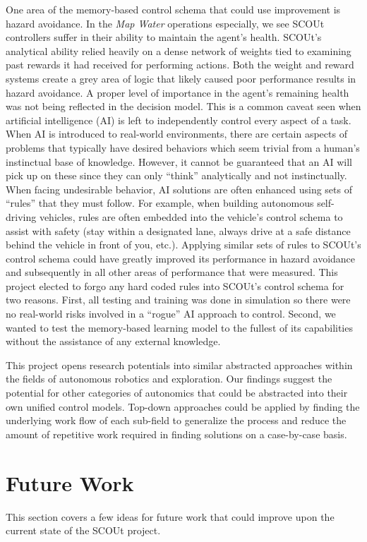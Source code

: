One area of the memory-based control schema that could use improvement is hazard avoidance.
In the \textit{Map Water} operations especially, we see SCOUt controllers suffer in their ability to maintain the agent's health.
SCOUt's analytical ability relied heavily on a dense network of weights tied to examining past rewards it had received for performing actions.
Both the weight and reward systems create a grey area of logic that likely caused poor performance results in hazard avoidance.
A proper level of importance in the agent's remaining health was not being reflected in the decision model.
This is a common caveat seen when artificial intelligence (AI) is left to independently control every aspect of a task.
When AI is introduced to real-world environments, there are certain aspects of problems that typically have desired behaviors which seem trivial from a human's instinctual base of knowledge.
However, it cannot be guaranteed that an AI will pick up on these since they can only ``think'' analytically and not instinctually.
When facing undesirable behavior, AI solutions are often enhanced using sets of ``rules'' that they must follow.
For example, when building autonomous self-driving vehicles, rules are often embedded into the vehicle's control schema to assist with safety (stay within a designated lane, always drive at a safe distance behind the vehicle in front of you, etc.).
Applying similar sets of rules to SCOUt's control schema could have greatly improved its performance in hazard avoidance and subsequently in all other areas of performance that were measured.
This project elected to forgo any hard coded rules into SCOUt's control schema for two reasons.
First, all testing and training was done in simulation so there were no real-world risks involved in a ``rogue'' AI approach to control.
Second, we wanted to test the memory-based learning model to the fullest of its capabilities without the assistance of any external knowledge.

This project opens research potentials into similar abstracted approaches within the fields of autonomous robotics and exploration.
Our findings suggest the potential for other categories of autonomics that could be abstracted into their own unified control models.
Top-down approaches could be applied by finding the underlying work flow of each sub-field to generalize the process and reduce the amount of repetitive work required in finding solutions on a case-by-case basis.




\section{Future Work} \label{sec:future_work}
This section covers a few ideas for future work that could improve upon the current state of the SCOUt project.

